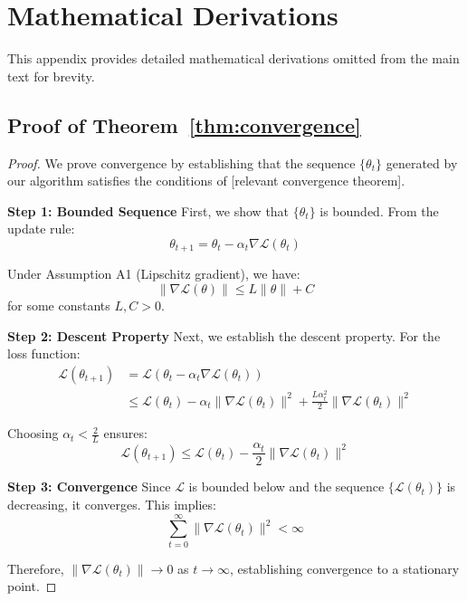 \appendix

\section{Mathematical Derivations}
\label{app:derivations}

This appendix provides detailed mathematical derivations omitted from the main text for brevity.

\subsection{Proof of Theorem~\ref{thm:convergence}}
\label{app:convergence_proof}

\begin{proof}
We prove convergence by establishing that the sequence $\{\theta_t\}$ generated by our algorithm satisfies the conditions of [relevant convergence theorem].

\textbf{Step 1: Bounded Sequence}
First, we show that $\{\theta_t\}$ is bounded. From the update rule:
\begin{equation}
\theta_{t+1} = \theta_t - \alpha_t \nabla \mathcal{L}(\theta_t)
\end{equation}

Under Assumption A1 (Lipschitz gradient), we have:
\begin{equation}
\|\nabla \mathcal{L}(\theta)\| \leq L \|\theta\| + C
\end{equation}
for some constants $L, C > 0$.

\textbf{Step 2: Descent Property}
Next, we establish the descent property. For the loss function:
\begin{align}
\mathcal{L}(\theta_{t+1}) &= \mathcal{L}(\theta_t - \alpha_t \nabla \mathcal{L}(\theta_t)) \\
&\leq \mathcal{L}(\theta_t) - \alpha_t \|\nabla \mathcal{L}(\theta_t)\|^2 + \frac{L\alpha_t^2}{2}\|\nabla \mathcal{L}(\theta_t)\|^2
\end{align}

Choosing $\alpha_t < \frac{2}{L}$ ensures:
\begin{equation}
\mathcal{L}(\theta_{t+1}) \leq \mathcal{L}(\theta_t) - \frac{\alpha_t}{2}\|\nabla \mathcal{L}(\theta_t)\|^2
\end{equation}

\textbf{Step 3: Convergence}
Since $\mathcal{L}$ is bounded below and the sequence $\{\mathcal{L}(\theta_t)\}$ is decreasing, it converges. This implies:
\begin{equation}
\sum_{t=0}^{\infty} \|\nabla \mathcal{L}(\theta_t)\|^2 < \infty
\end{equation}

Therefore, $\|\nabla \mathcal{L}(\theta_t)\| \rightarrow 0$ as $t \rightarrow \infty$, establishing convergence to a stationary point.
\end{proof}

